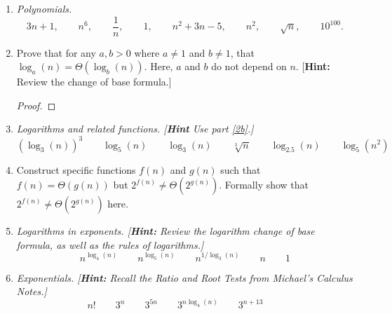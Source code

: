 \documentclass[11pt]{article}
\theoremstyle{definition}
\theoremstyle{definition}
\theoremstyle{definition}
\begin{document}
\begin{enumerate}[label=(2\alph*)]
\item \label{2a} {\itshape Polynomials.
\[
3n+1, \qquad 
n^6, \qquad
\frac{1}{n}, \qquad
1, \qquad
n^2 + 3n - 5, \qquad
n^2, \qquad
\sqrt{n}, \qquad
10^{100}.
\]
}


\newpage
\item \label{2b} Prove that for any $a, b > 0$ where $a \neq 1$ and $b \neq 1$, that $\log_{a}(n) = \Theta(\log_{b}(n))$. Here, $a$ and $b$ do not depend on $n$. [\textbf{Hint:} Review the change of base formula.]
\begin{proof}
\end{proof}

\newpage
\item \label{2c} {\itshape Logarithms and related functions. [\textbf{Hint} Use part \ref{2b}.]
\[
(\log_3(n))^3 \qquad 
\log_5(n) \qquad 
\log_3(n) \qquad 
\sqrt[3]{n} \qquad 
\log_{2.5}(n) \qquad 
\log_5 (n^2) 
\]
}

\newpage
\item \label{2d} Construct specific functions $f(n)$ and $g(n)$ such that $f(n) = \Theta(g(n))$ but $2^{f(n)} \not = \Theta(2^{g(n)})$. Formally show that $2^{f(n)} \not = \Theta(2^{g(n)})$ here.


\newpage
\item \label{2e} {\itshape Logarithms in exponents. [\textbf{Hint:} Review the logarithm change of base formula, as well as the rules of logarithms.]
\[
n^{\log_4(n)} \qquad 
n^{\log_5(n)} \qquad 
n^{1/\log_3(n)} \qquad 
n  \qquad 
1 
\]
}


\newpage
\item \label{2f} {\itshape Exponentials. [\textbf{Hint:} Recall the Ratio and Root Tests from Michael's Calculus Notes.]
\[
n! \qquad
3^n \qquad
3^{5n} \qquad
3^{n \log_4(n)} \qquad
3^{n+13} \qquad
\]
}
\end{enumerate}
\end{document}
